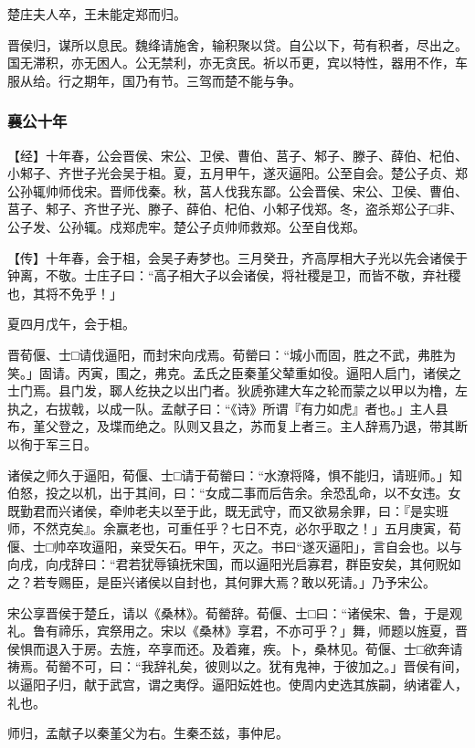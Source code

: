 \documentclass[]{article}
\begin{document}
楚庄夫人卒，王未能定郑而归。

晋侯归，谋所以息民。魏绛请施舍，输积聚以贷。自公以下，苟有积者，尽出之。国无滞积，亦无困人。公无禁利，亦无贪民。祈以币更，宾以特性，器用不作，车服从给。行之期年，国乃有节。三驾而楚不能与争。

\hypertarget{header-n1931}{%
\subsubsection{襄公十年}\label{header-n1931}}

【经】十年春，公会晋侯、宋公、卫侯、曹伯、莒子、邾子、滕子、薛伯、杞伯、小邾子、齐世子光会吴于柤。夏，五月甲午，遂灭逼阳。公至自会。楚公子贞、郑公孙辄帅师伐宋。晋师伐秦。秋，莒人伐我东鄙。公会晋侯、宋公、卫侯、曹伯、莒子、邾子、齐世子光、滕子、薛伯、杞伯、小邾子伐郑。冬，盗杀郑公子□非、公子发、公孙辄。戍郑虎牢。楚公子贞帅师救郑。公至自伐郑。

【传】十年春，会于柤，会吴子寿梦也。三月癸丑，齐高厚相大子光以先会诸侯于钟离，不敬。士庄子曰：``高子相大子以会诸侯，将社稷是卫，而皆不敬，弃社稷也，其将不免乎！」

夏四月戊午，会于柤。

晋荀偃、士□请伐逼阳，而封宋向戌焉。荀罃曰：``城小而固，胜之不武，弗胜为笑。」固请。丙寅，围之，弗克。孟氏之臣秦堇父辇重如役。逼阳人启门，诸侯之士门焉。县门发，郰人纥抉之以出门者。狄虒弥建大车之轮而蒙之以甲以为橹，左执之，右拔戟，以成一队。孟献子曰：``《诗》所谓『有力如虎』者也。」主人县布，堇父登之，及堞而绝之。队则又县之，苏而复上者三。主人辞焉乃退，带其断以徇于军三日。

诸侯之师久于逼阳，荀偃、士□请于荀罃曰：``水潦将降，惧不能归，请班师。」知伯怒，投之以机，出于其间，曰：``女成二事而后告余。余恐乱命，以不女违。女既勤君而兴诸侯，牵帅老夫以至于此，既无武守，而又欲易余罪，曰：『是实班师，不然克矣』。余赢老也，可重任乎？七日不克，必尔乎取之！」五月庚寅，荀偃、士□帅卒攻逼阳，亲受矢石。甲午，灭之。书曰``遂灭逼阳」，言自会也。以与向戌，向戌辞曰：``君若犹辱镇抚宋国，而以逼阳光启寡君，群臣安矣，其何贶如之？若专赐臣，是臣兴诸侯以自封也，其何罪大焉？敢以死请。」乃予宋公。

宋公享晋侯于楚丘，请以《桑林》。荀罃辞。荀偃、士□曰：``诸侯宋、鲁，于是观礼。鲁有禘乐，宾祭用之。宋以《桑林》享君，不亦可乎？」舞，师题以旌夏，晋侯惧而退入于房。去旌，卒享而还。及着雍，疾。卜，桑林见。荀偃、士□欲奔请祷焉。荀罃不可，曰：``我辞礼矣，彼则以之。犹有鬼神，于彼加之。」晋侯有间，以逼阳子归，献于武宫，谓之夷俘。逼阳妘姓也。使周内史选其族嗣，纳诸霍人，礼也。

师归，孟献子以秦堇父为右。生秦丕兹，事仲尼。
\end{document}
